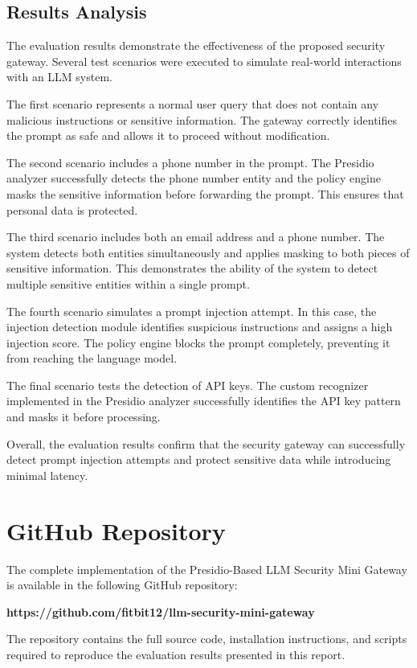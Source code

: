 \documentclass[conference]{IEEEtran}
\begin{document}
\subsection{Results Analysis}

The evaluation results demonstrate the effectiveness of the proposed security gateway. Several test scenarios were executed to simulate real-world interactions with an LLM system.

The first scenario represents a normal user query that does not contain any malicious instructions or sensitive information. The gateway correctly identifies the prompt as safe and allows it to proceed without modification.

The second scenario includes a phone number in the prompt. The Presidio analyzer successfully detects the phone number entity and the policy engine masks the sensitive information before forwarding the prompt. This ensures that personal data is protected.

The third scenario includes both an email address and a phone number. The system detects both entities simultaneously and applies masking to both pieces of sensitive information. This demonstrates the ability of the system to detect multiple sensitive entities within a single prompt.

The fourth scenario simulates a prompt injection attempt. In this case, the injection detection module identifies suspicious instructions and assigns a high injection score. The policy engine blocks the prompt completely, preventing it from reaching the language model.

The final scenario tests the detection of API keys. The custom recognizer implemented in the Presidio analyzer successfully identifies the API key pattern and masks it before processing.

Overall, the evaluation results confirm that the security gateway can successfully detect prompt injection attempts and protect sensitive data while introducing minimal latency.

\section{GitHub Repository}

The complete implementation of the Presidio-Based LLM Security Mini Gateway is available in the following GitHub repository:

\textbf{https://github.com/fitbit12/llm-security-mini-gateway}

The repository contains the full source code, installation instructions, and scripts required to reproduce the evaluation results presented in this report.
\end{document}
